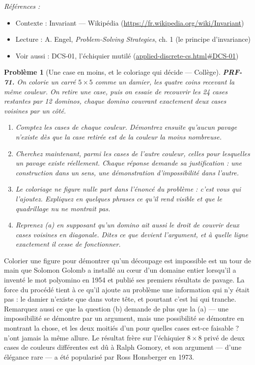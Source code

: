 \documentclass[11pt]{article}
\newtheorem{problem}{Problème}
\newenvironment{refs}{\par\small\noindent\emph{Références :}\begin{itemize}\setlength\itemsep{0pt}}{\end{itemize}\normalsize}
\begin{document}
\begin{refs}
\item Contexte : Invariant --- Wikipédia (\url{https://fr.wikipedia.org/wiki/Invariant})
\item Lecture : A. Engel, \textit{Problem-Solving Strategies}, ch. 1 (le principe d'invariance)
\item Voir aussi : DCS-01, l'échiquier mutilé (\url{applied-discrete-cs.html#DCS-01})
\end{refs}

\bigskip

\begin{problem}[{Une case en moins, et le coloriage qui décide --- Collège}]
\textbf{PRF-71.} On colorie un carré $ 5 \times 5 $ comme un damier, les quatre coins
recevant la même couleur. On retire une case, puis on essaie de recouvrir les 24 cases
restantes par 12 dominos, chaque domino couvrant exactement deux cases voisines par un
côté.
\begin{enumerate}
\item[(a)] Comptez les cases de chaque couleur. Démontrez ensuite qu'aucun pavage n'existe dès que
la case retirée est de la couleur la moins nombreuse.
\item[(b)] Cherchez maintenant, parmi les cases de l'autre couleur, celles pour lesquelles un
pavage existe réellement. Chaque réponse demande sa justification : une construction dans un
sens, une démonstration d'impossibilité dans l'autre.
\item[(c)] Le coloriage ne figure nulle part dans l'énoncé du problème : c'est vous qui l'ajoutez.
Expliquez en quelques phrases ce qu'il rend visible et que le quadrillage nu ne montrait
pas.
\item[(d)] Reprenez (a) en supposant qu'un domino ait aussi le droit de couvrir deux cases voisines
\textit{en diagonale}. Dites ce que devient l'argument, et à quelle ligne exactement il
cesse de fonctionner.
\end{enumerate}

\end{problem}

\noindent Colorier une figure pour démontrer qu'un découpage est impossible est un
tour de main que Solomon Golomb a installé au c\oe{}ur d'un domaine entier lorsqu'il a inventé
le mot \og{} polyomino \fg{} en 1954 et publié ses premiers résultats de pavage. La force du procédé
tient à ce qu'il ajoute au problème une information qui n'y était pas : le damier n'existe
que dans votre tête, et pourtant c'est lui qui tranche. Remarquez aussi ce que la question
(b) demande de plus que la (a) --- une impossibilité se démontre par un argument, mais une
possibilité se démontre en montrant la chose, et les deux moitiés d'un \og{} pour quelles cases
est-ce faisable ? \fg{} n'ont jamais la même allure. Le résultat frère sur l'échiquier
$ 8 \times 8 $ privé de deux cases de couleurs différentes est dû à Ralph Gomory, et son
argument --- d'une élégance rare --- a été popularisé par Ross Honsberger en 1973.
\end{document}
